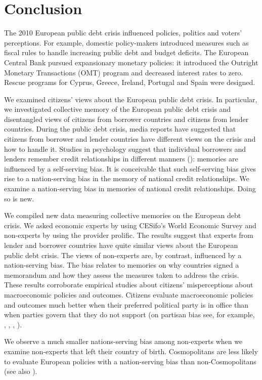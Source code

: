 \section{Conclusion} 
The 2010 European public debt crisis influenced policies, politics and voters' perceptions. For example, domestic policy-makers introduced measures such as fiscal rules to handle increasing public debt and budget deficits. The European Central Bank pursued expansionary monetary policies: it introduced the Outright Monetary Transactions (OMT) program and decreased interest rates to zero. Rescue programs for Cyprus, Greece, Ireland, Portugal and Spain were designed. 

We examined citizens' views about the European public debt crisis. In particular, we investigated collective memory of the European public debt crisis and disentangled views of citizens from borrower countries and citizens from lender countries. During the public debt crisis, media reports have suggested that citizens from borrower and lender countries have different views on the crisis and how to handle it. Studies in psychology suggest that individual borrowers and lenders remember credit relationships in different manners (\cite{dezso}): memories are influenced by a self-serving bias. It is conceivable that such self-serving bias gives rise to a nation-serving bias in the memory of national credit relationships. We examine a nation-serving bias in memories of national credit relationships. Doing so is new.

We compiled new data measuring collective memories on the European debt crisis. We asked economic experts by using CESifo's World Economic Survey and non-experts by using the provider prolific. The results suggest that experts from lender and borrower countries have quite similar views about the European public debt crisis. The views of non-experts are, by contrast, influenced by a nation-serving bias. The bias relates to memories on why countries signed a memorandum and how they assess the measures taken to address the crisis. These results corroborate empirical studies about citizens' misperceptions about macroeconomic policies and outcomes. Citizens evaluate macroeconomic policies and outcomes much better when their preferred political party is in office than when parties govern that they do not support (on partisan bias see, for example, \cite{evans}, \cite{gerber}, \cite{gillitzer}, \cite{bachmann}). 

We observe a much smaller nations-serving bias among non-experts when we examine non-experts that left their country of birth. Cosmopolitans are less likely to evaluate European policies with a nation-serving bias than non-Cosmopolitans (see also \cite{bechtel}).

